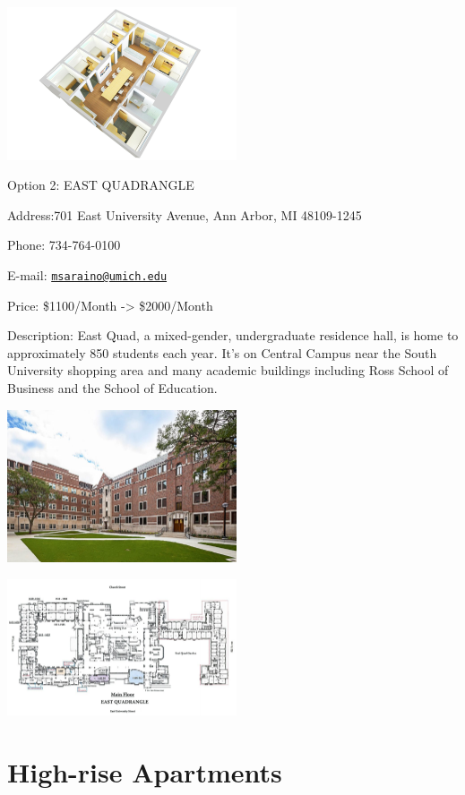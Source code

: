 \documentclass[
]{book}
\begin{document}
\includegraphics[width=2.66667in,height=\textheight]{MUNGER2.jpg}

Option 2: EAST QUADRANGLE

Address:701 East University Avenue, Ann Arbor, MI 48109-1245

Phone: 734-764-0100

E-mail: \href{mailto:msaraino@umich.edu}{\nolinkurl{msaraino@umich.edu}}

Price: \$1100/Month -\textgreater{} \$2000/Month

Description:
East Quad, a mixed-gender, undergraduate residence hall, is home to approximately 850 students each year. It's on Central Campus near the South University shopping area and many academic buildings including Ross School of Business and the School of Education.

\includegraphics[width=2.66667in,height=\textheight]{EQUA2.jpg}

\includegraphics[width=2.66667in,height=\textheight]{EQUA1.jpg}

\hypertarget{high-rise-apartments}{%
\section{High-rise Apartments}\label{high-rise-apartments}}
\end{document}
